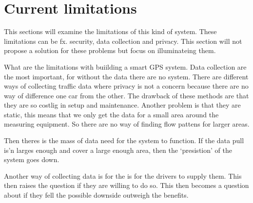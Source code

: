 \section{Current limitations}
This sections will examine the limitations of this kind of system. These limitations can be fx. security, data collection and privacy. This section will not propose a solution for these problems but focus on illuminateing them.
\newline

What are the limitations with buiilding a smart GPS system. Data collection are the most important, for without the data there are no system. There are different ways of collecting traffic data where privacy is not a concern because there are no way of difference one car from the other. The drawback of these methods are that they are so costlig in setup and maintenance. Another problem is that they are static, this means that we only get the data for a small area around the measuring equipment. So there are no way of finding flow pattens for larger areas.

Then theres is the mass of data need for the system to function. If the data pull is'n larges enough and cover a large enough area, then the `presistion' of the system goes down.

Another way of collecting data is for the is for the drivers to supply them. This then raises the question if they are willing to do so. This then becomes a question about if they fell the possible downside outweigh the benefits.
